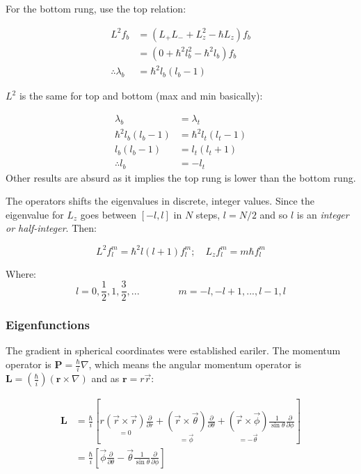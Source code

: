 \documentclass[12pt]{article}
\begin{document}
For the bottom rung, use the top relation:

\begin{align*}
    L^2 f_b &= (L_+ L_- +L_z^2 -\hbar L_z)f_b\\
    &= (0 + \hbar^2 l_b^2 -\hbar^2 l_b ) f_b\\
    \therefore \lambda_b &= \hbar^2l_b(l_b-1)
\end{align*}

$L^2$ is the same for top and bottom (max and min basically):

\begin{align*}
    \lambda_b &= \lambda_t\\
    \hbar^2l_b(l_b-1)& = \hbar^2l_t(l_t-1)\\
    l_b(l_b-1) &= l_t(l_t+1)\\
    \therefore l_b &= -l_t
\end{align*}
Other results are absurd as it implies the top rung is lower than the bottom rung. 

The operators shifts the eigenvalues in discrete, integer values. Since the eigenvalue for $L_z$ goes between $[-l,l]$ in $N$ steps, $l=N/2$ and so $l$ is an \textit{integer or half-integer}. Then:

\[\boxed{L^2 f^m_l = \hbar^2l(l+1)f^m_l; \quad L_zf^m_l = m\hbar f_l^m}\]

Where:
\[ l = 0,\frac12,1,\frac32,... \qquad \qquad m = -l, -l+1,...,l-1,l\]

\subsubsection{Eigenfunctions}

The gradient in spherical coordinates were established eariler. The momentum operator is $\mathbf{P} = \frac{\hbar}{i}\nabla$, which means the angular momentum operator is $\mathbf{L} = (\frac{\hbar}{i})(\mathbf{r}\times \nabla)$ and as $\mathbf{r} = r \vec{r}$:

\begin{align*}
    \mathbf{L} &= \frac{\hbar}{i}\left[
r\underset{= 0}{(\vec{r}\times\vec{r})}\frac{\partial}{\partial r} + \underset{=\vec{\phi}}{(\vec{r}\times\vec{\theta})}\frac{\partial}{\partial\theta} + \underset{=-\vec{\theta}}{(\vec{r}\times\vec{\phi})}\frac{1}{\sin\theta}\frac{\partial}{\partial\phi}
\right]\\
&= \frac{\hbar}{i}\left[ \vec{\phi}\frac{\partial}{\partial\theta} -\vec{\theta} \frac{1}{\sin\theta}\frac{\partial}{\partial\phi}\right]
\end{align*}
\end{document}
